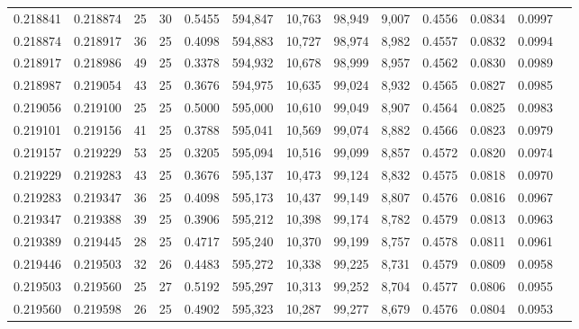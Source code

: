 \begin{tabular}{rrrrrrrrrrrrr}
0.218841 & 0.218874 &  25 &  30 &                                     0.5455 & 594,847 &  10,763 &  98,949 &   9,007 & 0.4556 & 0.0834 & 0.0997 \\
0.218874 & 0.218917 &  36 &  25 &                                     0.4098 & 594,883 &  10,727 &  98,974 &   8,982 & 0.4557 & 0.0832 & 0.0994 \\
0.218917 & 0.218986 &  49 &  25 &                                     0.3378 & 594,932 &  10,678 &  98,999 &   8,957 & 0.4562 & 0.0830 & 0.0989 \\
0.218987 & 0.219054 &  43 &  25 &                                     0.3676 & 594,975 &  10,635 &  99,024 &   8,932 & 0.4565 & 0.0827 & 0.0985 \\
0.219056 & 0.219100 &  25 &  25 &                                     0.5000 & 595,000 &  10,610 &  99,049 &   8,907 & 0.4564 & 0.0825 & 0.0983 \\
0.219101 & 0.219156 &  41 &  25 &                                     0.3788 & 595,041 &  10,569 &  99,074 &   8,882 & 0.4566 & 0.0823 & 0.0979 \\
0.219157 & 0.219229 &  53 &  25 &                                     0.3205 & 595,094 &  10,516 &  99,099 &   8,857 & 0.4572 & 0.0820 & 0.0974 \\
0.219229 & 0.219283 &  43 &  25 &                                     0.3676 & 595,137 &  10,473 &  99,124 &   8,832 & 0.4575 & 0.0818 & 0.0970 \\
0.219283 & 0.219347 &  36 &  25 &                                     0.4098 & 595,173 &  10,437 &  99,149 &   8,807 & 0.4576 & 0.0816 & 0.0967 \\
0.219347 & 0.219388 &  39 &  25 &                                     0.3906 & 595,212 &  10,398 &  99,174 &   8,782 & 0.4579 & 0.0813 & 0.0963 \\
0.219389 & 0.219445 &  28 &  25 &                                     0.4717 & 595,240 &  10,370 &  99,199 &   8,757 & 0.4578 & 0.0811 & 0.0961 \\
0.219446 & 0.219503 &  32 &  26 &                                     0.4483 & 595,272 &  10,338 &  99,225 &   8,731 & 0.4579 & 0.0809 & 0.0958 \\
0.219503 & 0.219560 &  25 &  27 &                                     0.5192 & 595,297 &  10,313 &  99,252 &   8,704 & 0.4577 & 0.0806 & 0.0955 \\
0.219560 & 0.219598 &  26 &  25 &                                     0.4902 & 595,323 &  10,287 &  99,277 &   8,679 & 0.4576 & 0.0804 & 0.0953 \\

\end{tabular}
